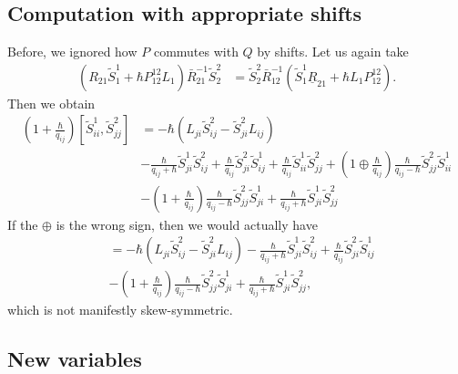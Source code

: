\documentclass[11pt]{report}
\theoremstyle{definition}
\theoremstyle{remark}
\theoremstyle{remark}
\begin{document}
\subsection{Computation with appropriate shifts}

Before, we ignored how $P$ commutes with $Q$ by shifts. Let us again take
\begin{align*}
(R_{21} \tilde S_1^1 + \hbar P^{12}_{12} L_1) \bar R_{21}^{-1} \tilde S_2^2
&= \tilde S_2^2 \bar R_{12}^{-1} (\tilde S_1^1 \underline{R}_{21} + \hbar L_1 P^{12}_{12}).
\end{align*}
Then we obtain
\begin{align*}
(1+\frac{\hbar}{q_{ij}})[\tilde S_{ii}^1,\tilde S_{jj}^2]
&= -\hbar(L_{ji} \tilde S_{ij}^2-\tilde S_{ji}^2 L_{ij}) \\
&- \frac{\hbar}{q_{ij}+\hbar} \tilde S_{ji}^1 \tilde S_{ij}^2
+ \frac{\hbar}{q_{ij}} \tilde S_{ji}^2 \tilde S_{ij}^1
+ \frac{\hbar}{q_{ij}}\tilde S_{ii}^1 \tilde S_{jj}^2
+ (1 \oplus \frac{\hbar}{q_{ij}}) \frac{\hbar}{q_{ij}-\hbar}\tilde S_{jj}^2 \tilde S_{ii}^1 \\
&- (1+\frac{\hbar}{q_{ij}}) \frac{\hbar}{q_{ij}-\hbar} \tilde S_{jj}^2 \tilde S_{ji}^1
+ \frac{\hbar}{q_{ij}+\hbar} \tilde S_{ji}^1 \tilde S_{jj}^2
\end{align*}
If the $\oplus$ is the wrong sign, then we would actually have
\begin{align*}
[\tilde S_{ii}^1,\tilde S_{jj}^2]
&= -\hbar(L_{ji} \tilde S_{ij}^2-\tilde S_{ji}^2 L_{ij}) - \frac{\hbar}{q_{ij}+\hbar} \tilde S_{ji}^1 \tilde S_{ij}^2
+ \frac{\hbar}{q_{ij}} \tilde S_{ji}^2 \tilde S_{ij}^1 \\
&- (1+\frac{\hbar}{q_{ij}}) \frac{\hbar}{q_{ij}-\hbar} \tilde S_{jj}^2 \tilde S_{ji}^1
+ \frac{\hbar}{q_{ij}+\hbar} \tilde S_{ji}^1 \tilde S_{jj}^2,
\end{align*}
which is not manifestly skew-symmetric.

\subsection{New variables}
\end{document}
